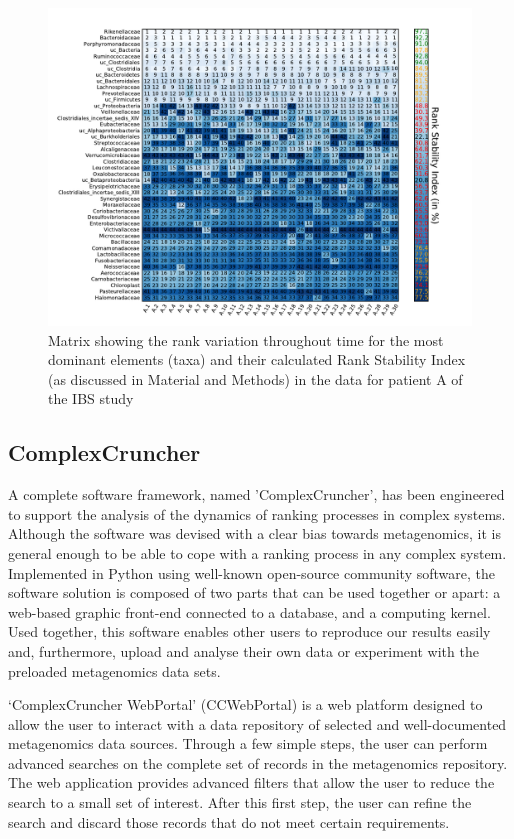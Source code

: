 \begin{figure}
	\centering
	\includegraphics[width=\textwidth]{results/corrank/IBS_h_A_amplicons_family_Rank.pdf}
	\caption{Matrix showing the rank variation throughout time for the most dominant elements (taxa) and their calculated Rank Stability Index (as discussed in Material and Methods) in the data  for patient A of the IBS study\cite{IBS}}
	\label{fig:corrank}
\end{figure}

\subsection*{ComplexCruncher}

A complete software framework, named 'ComplexCruncher', has been engineered to support the analysis of the dynamics of ranking processes in complex systems. Although the software was devised with a clear bias towards metagenomics, it is general enough to be able to cope with a ranking process in any complex system. Implemented in Python using well-known open-source community software, the software solution is composed of two parts that can be used together or apart: a web-based graphic front-end connected to a database, and a computing kernel. Used together, this software enables other users to reproduce our results easily and, furthermore, upload and analyse their own data or experiment with the preloaded metagenomics data sets.

`ComplexCruncher WebPortal' (CCWebPortal) is a web platform designed to allow the user to interact with a data repository of selected and well-documented metagenomics data sources. Through a few simple steps, the user can perform advanced searches on the complete set of records in the metagenomics repository.  The web application provides advanced filters that allow the user to reduce the search to a small set of interest. After this first step, the user can refine the search and discard those records that do not meet certain requirements.

